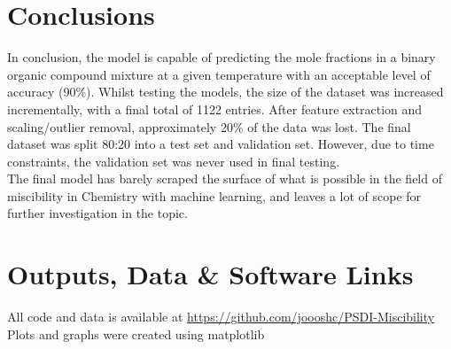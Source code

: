 \documentclass[11pt, titlepage]{article}
\begin{document}
\section{Conclusions}
\label{section:conclusions}
In conclusion, the model is capable of predicting the mole fractions in a binary organic compound mixture at a given temperature with an acceptable level of accuracy (90\%). Whilst testing the models, the size of the dataset was increased incrementally, with a final total of 1122 entries. After feature extraction and scaling/outlier removal, approximately 20\% of the data was lost. The final dataset was split 80:20 into a test set and validation set. However, due to time constraints, the validation set was never used in final testing.\\

The final model has barely scraped the surface of what is possible in the field of miscibility in Chemistry with machine learning, and leaves a lot of scope for further investigation in the topic.

\section{Outputs, Data \& Software Links}
All code and data is available at \url{https://github.com/joooshc/PSDI-Miscibility} \\
Plots and graphs were created using matplotlib\cite{matplotlib}
\label{section:outputs}



\end{document}
